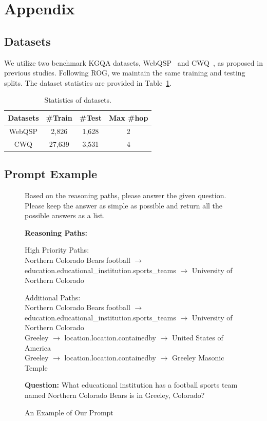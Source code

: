 \documentclass[11pt]{article}
\begin{document}
%


\clearpage
\appendix

\section{Appendix}
\label{sec:appendix}
\subsection{Datasets}
\label{sec:dataset}
We utilize two benchmark KGQA datasets, WebQSP~\cite{yih2016value} and CWQ~\cite{talmor2018web}, as proposed in previous studies. Following ROG, we maintain the same training and testing splits. The dataset statistics are provided in Table~\ref{tab:datasets}.
\begin{table}
\centering
\caption{Statistics of datasets.}
\label{tab:datasets}
\begin{tabular}{c|ccc}
\hline
Datasets & \#Train & \#Test & Max \#hop \\
\hline
WebQSP & 2,826 & 1,628 & 2 \\
CWQ & 27,639 & 3,531 & 4 \\
\hline
\end{tabular}
\end{table}
\subsection{Prompt Example}\label{sec:prompt}
\begin{figure}[!b]
\begin{tcolorbox}[mybox={Prompts}]
Based on the reasoning paths, please answer the given question. Please keep the answer as simple as possible and return all the possible answers as a list.

\textbf{Reasoning Paths:}

\colorbox{green!20}
{High Priority Paths:}\\
Northern Colorado Bears football $\rightarrow$ education.educational\_institution.sports\_teams $\rightarrow$ University of Northern Colorado

\colorbox{green!20}{Additional Paths:}\\
Northern Colorado Bears football $\rightarrow$ education.educational\_institution.sports\_teams $\rightarrow$ University of Northern Colorado\\
Greeley $\rightarrow$ location.location.containedby $\rightarrow$ United States of America\\
Greeley $\rightarrow$ location.location.containedby $\rightarrow$ Greeley Masonic Temple

\textbf{Question:} 
What educational institution has a football sports team named Northern Colorado Bears is in Greeley, Colorado?
\end{tcolorbox}
\caption{An Example of Our Prompt}
\label{originalprompt}
\end{figure}
\end{document}
